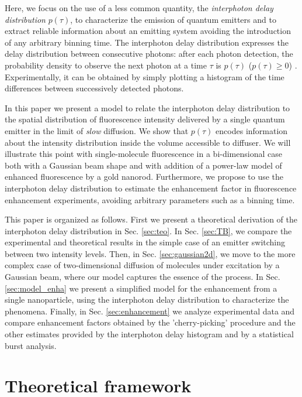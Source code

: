 Here, we focus on the use of a less common quantity, the 
\textit{interphoton delay distribution} $p(\tau)$,
to characterize the emission of quantum emitters and to extract reliable 
information about an emitting system avoiding the introduction of any arbitrary 
binning time. The interphoton delay distribution expresses the delay distribution 
between consecutive photons: after each photon detection, the probability density to observe 
the next photon at a time $\tau$ is $p(\tau)$ ($p(\tau)\geq 0$) \cite{Verberk2003}.
Experimentally, it can be obtained by simply plotting a histogram of the time differences between 
successively detected photons.

In this paper we present a model to relate the interphoton delay distribution
to the spatial distribution of fluorescence intensity delivered by a 
single quantum emitter in the limit of \textit{slow} diffusion. We show that $p(\tau)$ 
encodes information about the intensity distribution inside the volume accessible 
to diffuser. We will illustrate this point with single-molecule fluorescence 
in a bi-dimensional case both with a Gaussian beam shape and with addition of a power-law model of 
enhanced fluorescence by a gold nanorod. 
Furthermore, we propose to use the interphoton delay distribution to estimate
the enhancement factor in fluorescence enhancement experiments, avoiding
arbitrary parameters such as a binning time. 

This paper is organized as follows. First we present a theoretical
derivation of the interphoton delay distribution in Sec. \ref{sec:teo}. In Sec.
\ref{sec:TB}, we compare the experimental and theoretical results in
the simple case of an emitter switching between two intensity levels. Then, in Sec. 
\ref{sec:gaussian2d}, we move to the 
more complex case of two-dimensional diffusion of molecules under excitation by a
Gaussian beam, where our model captures the essence of the process.
In Sec. \ref{sec:model_enha} we present a simplified model for the
enhancement from a single nanoparticle, using the interphoton delay distribution
to characterize the phenomena. 
Finally, in Sec. \ref{sec:enhancement} we analyze experimental data and 
compare enhancement factors obtained by the 'cherry-picking' procedure and the 
other estimates provided by the interphoton delay histogram and by a statistical burst analysis.

\section{Theoretical framework\label{sec:teo}}

